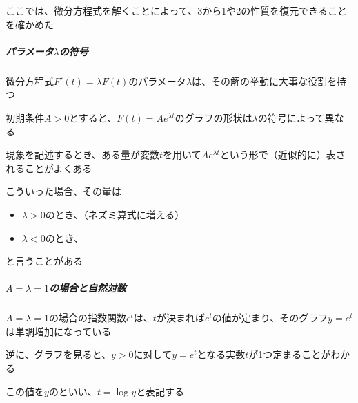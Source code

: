 \documentclass[../book_jiriki_calc]{subfiles}
\begin{document}
\br

ここでは、微分方程式を解くことによって、3から1や2の性質を復元できることを確かめた

\sectionline

\subparagraph{パラメータ$\lambda$の符号}\quad

微分方程式$F'(t)=\lambda F(t)$のパラメータ$\lambda$は、その解の挙動に大事な役割を持つ

\br

初期条件$A>0$とすると、$F(t) = Ae^{\lambda t}$のグラフの形状は$\lambda$の符号によって異なる

\br

現象を記述するとき、ある量が変数$t$を用いて$Ae^{\lambda t}$という形で（近似的に）表されることがよくある

こういった場合、その量は
\begin{itemize}
  \item $\lambda>0$のとき、（ネズミ算式に増える）
  \item $\lambda<0$のとき、
\end{itemize}
と言うことがある

\sectionline

\subparagraph{$A=\lambda=1$の場合と自然対数}\quad

$A=\lambda=1$の場合の指数関数$e^t$は、$t$が決まれば$e^t$の値が定まり、そのグラフ$y=e^t$は単調増加になっている

\br

逆に、グラフを見ると、$y>0$に対して$y=e^t$となる実数$t$が1つ定まることがわかる

この値を$y$のといい、$t = \log y$と表記する
\end{document}
